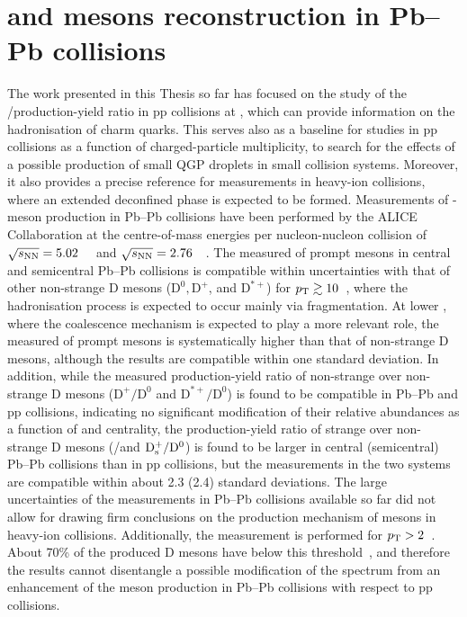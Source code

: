 \chapter{\texorpdfstring{\ds and \dpl mesons reconstruction in Pb--Pb collisions}{Ds+ and D+ mesons reconstruction in Pb--Pb collisions}}\label{ch:PbPb}
The work presented in this Thesis so far has focused on the study of the \ds/\dpl production-yield ratio in pp collisions at \thirteen, which can provide information on the hadronisation of charm quarks. This serves also as a baseline for studies in pp collisions as a function of charged-particle multiplicity, to search for the effects of a possible production of small QGP droplets in small collision systems. Moreover, it also provides a precise reference for measurements in heavy-ion collisions, where an extended deconfined phase is expected to be formed. Measurements of \ds-meson production in Pb--Pb collisions have been performed by the ALICE Collaboration at the centre-of-mass energies per nucleon-nucleon collision of $\sqrt{s_\mathrm{NN}}=5.02$~\tev~\cite{ALICE:2021kfc,ALICE:2018lyv} and $\sqrt{s_\mathrm{NN}}=2.76$~\tev~\cite{ALICE:2015dry}. The measured \raa of prompt \ds mesons in central and semicentral Pb--Pb collisions is compatible within uncertainties with that of other non-strange D mesons ($\mathrm{D^0, D^+}$, and $\mathrm{D^{*+}}$) for $p_\mathrm{T}\gtrsim10$~\gevc, where the hadronisation process is expected to occur mainly via fragmentation. At lower \pt, where the coalescence mechanism is expected to play a more relevant role, the measured \raa of prompt \ds mesons is systematically higher than that of non-strange D mesons, although the results are compatible within one standard deviation. In addition, while the measured production-yield ratio of non-strange over non-strange D mesons ($\mathrm{D^+/D^0}$ and $\mathrm{D^{*+}/D^0}$) is found to be compatible in Pb--Pb and pp collisions, indicating no significant modification of their relative abundances as a function of \pt and centrality, the production-yield ratio of strange over non-strange D mesons (\ds/\dpl and $\mathrm{D_s^+}/\mathrm{D^0}$) is found to be larger in central (semicentral) Pb--Pb collisions than in pp collisions, but the measurements in the two systems are compatible within about 2.3 (2.4) standard deviations. The large uncertainties of the measurements in Pb--Pb collisions available so far did not allow for drawing firm conclusions on the production mechanism of \ds mesons in heavy-ion collisions. Additionally, the measurement is performed for $p_\mathrm{T}>2$~\gevc. About 70\% of the produced D mesons have \pt below this threshold~\cite{ALICE:2021rxa}, and therefore the results cannot disentangle a possible modification of the \pt spectrum from an enhancement of the \ds meson production in Pb--Pb collisions with respect to pp collisions.

